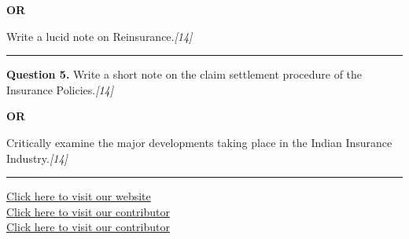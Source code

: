 \documentclass[11pt,a4paper]{article}
\newcommand{\pts}[1]{\hfill   \textit{[#1]}}
\begin{document}
\centerline{   \textbf{OR}}

Write a lucid note on Reinsurance.\pts{14}

\medskip\rule{\linewidth}{0.2pt}




\noindent   \textbf{Question 5.}
Write a short note on the claim settlement procedure of the Insurance Policies.\pts{14}

\centerline{   \textbf{OR}}

Critically examine the major developments taking place in the Indian Insurance Industry.\pts{14}

\vfill
\rule{\linewidth}{0.4pt}

\begin{center}\small
\href{https://bhu-exam.vercel.app/}{Click here to visit our website}\\[4pt]
\href{https://me-aryan.vercel.app/}{Click here to visit our contributor}\\[4pt]
\href{https://quashan-me.vercel.app/}{Click here to visit our contributor}
\end{center}
\end{document}
